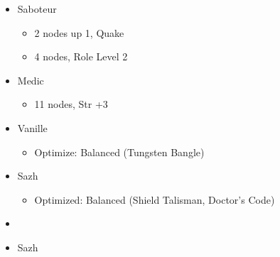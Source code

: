 \begin{paracol}{2}
\begin{menu}
\begin{itemize}
\begin{itemize}
\begin{itemize}
					      \item Saboteur
					            \begin{itemize}
						            \item 2 nodes up 1, Quake
						            \item 4 nodes, Role Level 2
					            \end{itemize}
					      \item Medic
					            \begin{itemize}
						            \item 11 nodes, Str +3
					            \end{itemize}
				      \end{itemize}
			\end{itemize}

			\equip
			\begin{itemize}
				\item Vanille
				      \begin{itemize}
					      \item \begin{flushleft}Optimize: Balanced (Tungsten Bangle)\end{flushleft}
				      \end{itemize}
				\item Sazh
				      \begin{itemize}
					      \item \begin{flushleft}Optimized: Balanced (Shield Talisman, Doctor's Code)\end{flushleft}
				      \end{itemize}
			\end{itemize}
		\end{itemize}
	\end{menu}
	\switchcolumn
	\begin{menu}
		\begin{itemize}
			\paradigm
			\begin{itemize}
				\item {}%
				      {\paradigmline[1]{\textit{\com}}{\textit{\rav}}{}}%
				      {\paradigmline{(\com)}{(\med)}{}}%
				      {\paradigmline{\syn}{\sab}{}}%
				      {\paradigmline{\rav}{\rav}{}}%
				      {\paradigmline{\rav}{\sab}{}}%
				      {\paradigmline{\com}{\sab}{}}
			\end{itemize}
			\crystarium
			\begin{itemize}
				\item Sazh

\end{itemize}
\end{itemize}
\end{menu}
\end{paracol}
